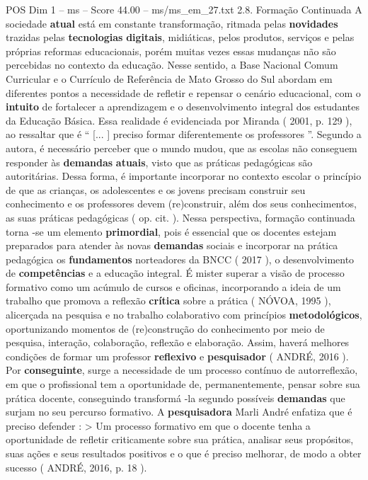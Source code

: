 \begin{textsample}{POS Dim 1 – ms – Score 44.00 – ms/ms\_em\_27.txt}  \label{ex:f1_pos_188}
2.8.
Formação Continuada A sociedade \textbf{atual} está em constante transformação, ritmada pelas \textbf{novidades} trazidas pelas \textbf{tecnologias} \textbf{digitais}, midiáticas, pelos produtos, serviços e pelas próprias reformas educacionais, porém muitas vezes essas mudanças não são percebidas no contexto da educação.
Nesse sentido, a Base Nacional Comum Curricular e o Currículo de Referência de Mato Grosso do Sul abordam em diferentes pontos a necessidade de refletir e repensar o cenário educacional, com o \textbf{intuito} de fortalecer a aprendizagem e o desenvolvimento integral dos estudantes da Educação Básica.
Essa realidade é evidenciada por Miranda ( 2001, p. 129 ), ao ressaltar que é “ [... ] preciso formar diferentemente os professores ”.
Segundo a autora, é necessário perceber que o mundo mudou, que as escolas não conseguem responder às \textbf{demandas} \textbf{atuais}, visto que as práticas pedagógicas são autoritárias.
Dessa forma, é importante incorporar no contexto escolar o princípio de que as crianças, os adolescentes e os jovens precisam construir seu conhecimento e os professores devem (re)construir, além dos seus conhecimentos, as suas práticas pedagógicas ( op. cit. ).
Nessa perspectiva, formação continuada torna -se um elemento \textbf{primordial}, pois é essencial que os docentes estejam preparados para atender às novas \textbf{demandas} sociais e incorporar na prática pedagógica os \textbf{fundamentos} norteadores da BNCC ( 2017 ), o desenvolvimento de \textbf{competências} e a educação integral.
É mister superar a visão de processo formativo como um acúmulo de cursos e oficinas, incorporando a ideia de um trabalho que promova a reflexão \textbf{crítica} sobre a prática ( NÓVOA, 1995 ), alicerçada na pesquisa e no trabalho colaborativo com princípios \textbf{metodológicos}, oportunizando momentos de (re)construção do conhecimento por meio de pesquisa, interação, colaboração, reflexão e elaboração.
Assim, haverá melhores condições de formar um professor \textbf{reflexivo} e \textbf{pesquisador} ( ANDRÉ, 2016 ).
Por \textbf{conseguinte}, surge a necessidade de um processo contínuo de autorreflexão, em que o profissional tem a oportunidade de, permanentemente, pensar sobre sua prática docente, conseguindo transformá -la segundo possíveis \textbf{demandas} que surjam no seu percurso formativo.
A \textbf{pesquisadora} Marli André enfatiza que é preciso defender : > Um processo formativo em que o docente tenha a oportunidade de refletir criticamente sobre sua prática, analisar seus propósitos, suas ações e seus resultados positivos e o que é preciso melhorar, de modo a obter sucesso ( ANDRÉ, 2016, p. 18 ).

\end{textsample}
